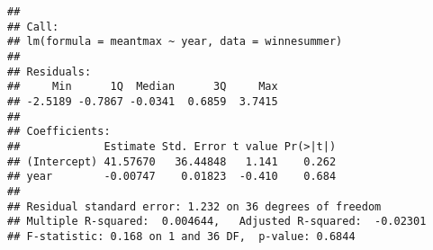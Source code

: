 \documentclass[
]{book}
\newenvironment{Shaded}{\begin{snugshade}}{\end{snugshade}}
\newcommand{\AttributeTok}[1]{\textcolor[rgb]{0.77,0.63,0.00}{#1}}
\newcommand{\CommentTok}[1]{\textcolor[rgb]{0.56,0.35,0.01}{\textit{#1}}}
\newcommand{\DecValTok}[1]{\textcolor[rgb]{0.00,0.00,0.81}{#1}}
\newcommand{\FunctionTok}[1]{\textcolor[rgb]{0.00,0.00,0.00}{#1}}
\newcommand{\NormalTok}[1]{#1}
\newcommand{\OtherTok}[1]{\textcolor[rgb]{0.56,0.35,0.01}{#1}}
\newcommand{\SpecialCharTok}[1]{\textcolor[rgb]{0.00,0.00,0.00}{#1}}
\begin{document}
\begin{Shaded}
\end{Shaded}

\begin{verbatim}
## 
## Call:
## lm(formula = meantmax ~ year, data = winnesummer)
## 
## Residuals:
##     Min      1Q  Median      3Q     Max 
## -2.5189 -0.7867 -0.0341  0.6859  3.7415 
## 
## Coefficients:
##             Estimate Std. Error t value Pr(>|t|)
## (Intercept) 41.57670   36.44848   1.141    0.262
## year        -0.00747    0.01823  -0.410    0.684
## 
## Residual standard error: 1.232 on 36 degrees of freedom
## Multiple R-squared:  0.004644,   Adjusted R-squared:  -0.02301 
## F-statistic: 0.168 on 1 and 36 DF,  p-value: 0.6844
\end{verbatim}
\end{document}
